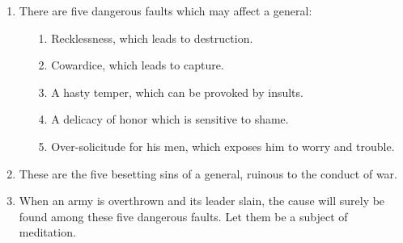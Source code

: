 \documentclass[oneside]{book}
\begin{document}
\begin{enumerate}
	\item There are five dangerous faults which may affect a general:
	\begin{enumerate}
	    \item[1.] Recklessness, which leads to destruction.
	    \item[2.] Cowardice, which leads to capture.
	    \item[3.] A hasty temper, which can be provoked by insults.
	    \item[4.] A delicacy of honor which is sensitive to shame.
	    \item[5.] Over-solicitude for his men, which exposes him to worry and trouble.
	\end{enumerate}
	\item These are the five besetting sins of a general, ruinous to the conduct of war.
	\item When an army is overthrown and its leader slain, the cause will surely be found among these five dangerous faults. Let them be a subject of meditation.
\end{enumerate}
\end{document}
